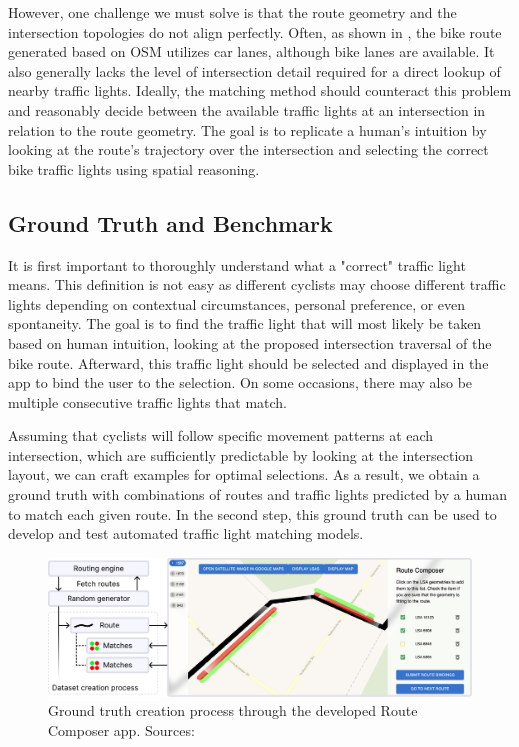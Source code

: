 However, one challenge we must solve is that the route geometry and the intersection topologies do not align perfectly. Often, as shown in , the bike route generated based on OSM utilizes car lanes, although bike lanes are available. It also generally lacks the level of intersection detail required for a direct lookup of nearby traffic lights. Ideally, the matching method should counteract this problem and reasonably decide between the available traffic lights at an intersection in relation to the route geometry. The goal is to replicate a human's intuition by looking at the route's trajectory over the intersection and selecting the correct bike traffic lights using spatial reasoning.

\subsection{Ground Truth and Benchmark}

It is first important to thoroughly understand what a "correct" traffic light means. This definition is not easy as different cyclists may choose different traffic lights depending on contextual circumstances, personal preference, or even spontaneity. The goal is to find the traffic light that will most likely be taken based on human intuition, looking at the proposed intersection traversal of the bike route. Afterward, this traffic light should be selected and displayed in the app to bind the user to the selection. On some occasions, there may also be multiple consecutive traffic lights that match.

Assuming that cyclists will follow specific movement patterns at each intersection, which are sufficiently predictable by looking at the intersection layout, we can craft examples for optimal selections. As a result, we obtain a ground truth with combinations of routes and traffic lights predicted by a human to match each given route. In the second step, this ground truth can be used to develop and test automated traffic light matching models.

\begin{figure}[t]
\centering
\includegraphics[width=\linewidth]{images/sg-selection-ground-truth.pdf}
\caption{Ground truth creation process through the developed Route Composer app. Sources: \cite{matthes2022matching, matthes2023geo}}
\label{fig:sg-selection-ground-truth}
\end{figure}

